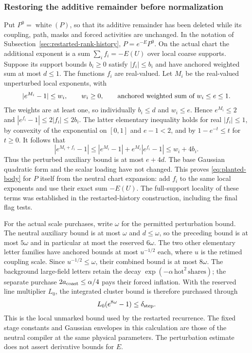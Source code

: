\subsubsection{Restoring the additive remainder before normalization}

Put $P^0=\operatorname{white}(P)$, so that its additive remainder has
been deleted while its coupling, path, masks and forced activities are
unchanged. In the notation of Subsection~\ref{sec:restarted-rank-history},
$P=e^{-E}P^0$. On the actual chart the additional exponent is a sum
$\sum_i f_i=-E(U)$ over local coarse supports. Suppose its support
bounds $b_i\ge0$ satisfy $|f_i|\le b_i$ and have anchored weighted
sum at most $d\le1$. The functions $f_i$ are real-valued. Let $M_i$ be the real-valued
unperturbed local exponents,
with
\[
 |e^{M_i}-1|\le w_i,\qquad w_i\ge0,
 \qquad\hbox{anchored weighted sum of }w_i\le e\le1.
\]
The weights are at least one, so individually $b_i\le d$ and
$w_i\le e$. Hence $e^{M_i}\le2$ and
$|e^{f_i}-1|\le2|f_i|\le2b_i$. The latter elementary inequality
holds for real $|f_i|\le1$, by convexity of the exponential on
$[0,1]$ and $e-1<2$, and by $1-e^{-t}\le t$ for $t\ge0$.
It follows that
\[
 |e^{M_i+f_i}-1|
 \le |e^{M_i}-1|+e^{M_i}|e^{f_i}-1|
 \le w_i+4b_i.
\]
Thus the perturbed auxiliary bound is at most $e+4d$. The base Gaussian
quadratic form and the scalar loading have not changed. This proves
\eqref{eq:planted-body} for $P$ itself from the neutral chart expansion:
add $f_i$ to the same local exponents and use their exact sum $-E(U)$.
The full-support locality of these terms was established in the
restarted-history construction, including the final flag tests.

For the actual scale purchases, write $\omega$ for the permitted
perturbation bound. The neutral auxiliary bound is at most $\omega$
and $d\le\omega$, so the preceding bound is at most $5\omega$ and
in particular at most the reserved $6\omega$. The two other elementary
letter families have anchored bounds at most $u^{-1/2}$ each, where
$u$ is the retimed coupling scale. Since $u^{-1/2}\le\omega$, their
combined bound is at most $8\omega$. The background large-field
letters retain the decay $\exp(-\alpha\,\mathrm{hot}^2\,\mathrm{shares})$;
the separate purchase $2a_{\rm coast}\le\alpha/4$ pays their forced
inflation. With the reserved line multiplier $L_0$, the integrated
cluster bound is therefore purchased through
\[
                 L_0(e^{8\omega}-1)\le\delta_{\rm step}.
\]
This is the local unmarked bound used by the restarted recurrence.
The fixed stage constants and Gaussian envelopes in this calculation
are those of the neutral compiler at the same physical parameters.
The perturbation estimate does not assert derivative bounds for $E$.

